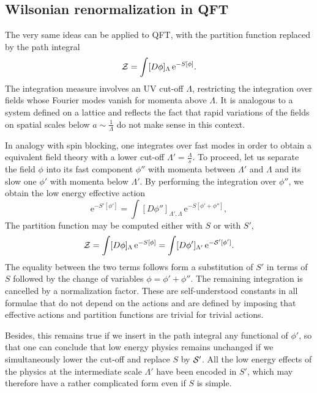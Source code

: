 \documentclass[12pt,here,feynmf]{article}
\begin{document}
\subsection{Wilsonian renormalization in QFT }


The very same ideas can be applied to QFT, with the partition function replaced by the path integral
\begin{equation}
{\cal Z}=\int[D\phi]_{\Lambda}\,\mathrm{e}^{-S[\phi]}.
\end{equation}   
The integration  measure involves an UV cut-off $\Lambda$, restricting the integration over fields whose Fourier modes vanish for momenta above $\Lambda$. It is analogous to a system defined on a lattice and reflects the fact that rapid variations of the fields on spatial scales below $a\sim\frac{1}{\Lambda}$ do not make sense in this context.  

In analogy with spin blocking, one integrates over fast modes in order to obtain a equivalent field theory with a lower cut-off $\Lambda'=\frac{\Lambda}{s}$. To proceed, let us separate the field $\phi$ into its fast component $\phi''$ with momenta between $\Lambda'$ and $\Lambda$ and its slow one $\phi'$ with momenta below $\Lambda'$. By performing the integration over $\phi''$, we obtain the low energy effective action 
\begin{equation}
\mathrm{e}^{-S'[\phi']}=\int[D\phi'']_{\Lambda',\Lambda}\,
\mathrm{e}^{-S[\phi'+\phi'']},
\end{equation}
The partition function may be computed either with $S$ or with $S'$,
\begin{equation}
{\cal Z}=\int[D\phi]_{\Lambda}\,\mathrm{e}^{-S[\phi]}=
\int[D\phi']_{\Lambda'}\,\mathrm{e}^{-{\cal S'}[\phi']}.
\end{equation}
The equality between the two terms follows form a substitution of $S'$ in terms of $S$ followed by the change of variables $\phi=\phi'+\phi''$. The remaining integration is cancelled by a normalization factor. These are self-understood constants in all formulae that do not depend on the actions and are defined by imposing that effective actions and partition functions are trivial for trivial actions. 

Besides, this remains true if we insert in the path integral any functional of $\phi'$, so that one can conclude that low energy  physics remains unchanged if we simultaneously lower the cut-off and replace $S$ by ${\cal S'}$. All the low energy effects of the physics at the intermediate scale  $\Lambda'$ have been encoded in $S'$, which may therefore have a rather complicated form even if $S$ is simple. 
\end{document}
